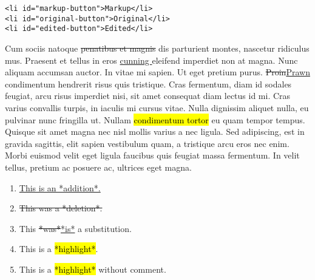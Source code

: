 \hypertarget{criticnav}{}
\begin{verbatim}
<li id="markup-button">Markup</li>
<li id="original-button">Original</li>
<li id="edited-button">Edited</li>
\end{verbatim}

\hypertarget{wrapper}{}
Cum sociis natoque
\st{penatibus et magnis} dis
parturient montes, nascetur ridiculus mus. Praesent et tellus in eros
\underline{cunning }eleifend
imperdiet non at magna. Nunc aliquam accumsan auctor. In vitae mi
sapien. Ut eget pretium purus.
\st{Proin}\underline{Prawn}
condimentum hendrerit risus quis tristique. Cras fermentum, diam id
sodales feugiat, arcu risus imperdiet nisi, sit amet consequat diam
lectus id mi. Cras varius convallis turpis, in iaculis mi cursus vitae.
Nulla dignissim aliquet nulla, eu pulvinar nunc fringilla ut. Nullam
\hl{condimentum tortor} eu quam tempor tempus. Quisque
sit amet magna nec nisl mollis varius a nec ligula. Sed adipiscing, est
in gravida sagittis, elit sapien vestibulum quam, a
tristique arcu eros nec enim. Morbi euismod
velit eget ligula faucibus quis feugiat massa fermentum. In velit
tellus, pretium ac posuere ac, ultrices eget magna.

\begin{enumerate}
\def\labelenumi{\arabic{enumi}.}
\tightlist
\item
  \underline{This is an *addition*.}
\item
  \st{This was a *deletion*.}
\item
  This \st{*was*}\underline{*is*} a substitution.
\item
  This is a
  \hl{*highlight*}.
\item
  This is a \hl{*highlight*} without comment.
\end{enumerate}
